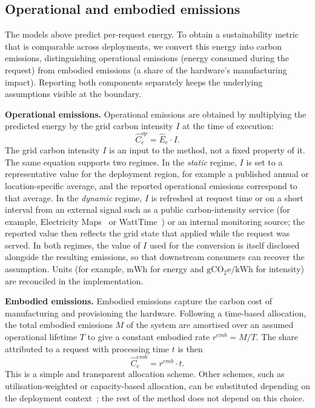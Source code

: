 \documentclass[sigconf]{acmart}
\begin{document}
\subsection{Operational and embodied emissions}
\label{subsec:emissions}

The models above predict per-request energy. To obtain a sustainability metric that is comparable across deployments, we convert this energy into carbon emissions, distinguishing operational emissions (energy consumed during the request) from embodied emissions (a share of the hardware's manufacturing impact). Reporting both components separately keeps the underlying assumptions visible at the boundary.

\textbf{Operational emissions.}
Operational emissions are obtained by multiplying the predicted energy by the grid carbon intensity \(I\) at the time of execution:
\[
\widehat{C}^{op}_e = \widehat{E}_e \cdot I.
\]
The grid carbon intensity \(I\) is an input to the method, not a fixed
property of it. The same equation supports two regimes. In the
\emph{static} regime, \(I\) is set to a representative value for the
deployment region, for example a published annual or location-specific
average, and the reported operational emissions correspond to that
average. In the \emph{dynamic} regime, \(I\) is refreshed at request
time or on a short interval from an external signal such as a public
carbon-intensity service (for example, Electricity
Maps~\cite{electricitymaps} or WattTime~\cite{watttime}) or an
internal monitoring source; the reported value then reflects the grid
state that applied while the request was served. In both regimes, the
value of \(I\) used for the conversion is itself disclosed alongside
the resulting emissions, so that downstream consumers can recover the
assumption. Units (for example, \(\mathrm{mWh}\) for energy and
\(\mathrm{gCO_2e/kWh}\) for intensity) are reconciled in the
implementation.

\textbf{Embodied emissions.}
Embodied emissions capture the carbon cost of manufacturing and provisioning the hardware. Following a time-based allocation, the total embodied emissions \(M\) of the system are amortised over an assumed operational lifetime \(T\) to give a constant embodied rate \(r^{emb} = M/T\). The share attributed to a request with processing time \(t\) is then
\[
\widehat{C}^{emb}_e = r^{emb} \cdot t.
\]
This is a simple and transparent allocation scheme. Other schemes, such as utilisation-weighted or capacity-based allocation, can be substituted depending on the deployment context~\cite{iso14040,iso14044,ghgproduct,gsf-sci}; the rest of the method does not depend on this choice.
\end{document}
